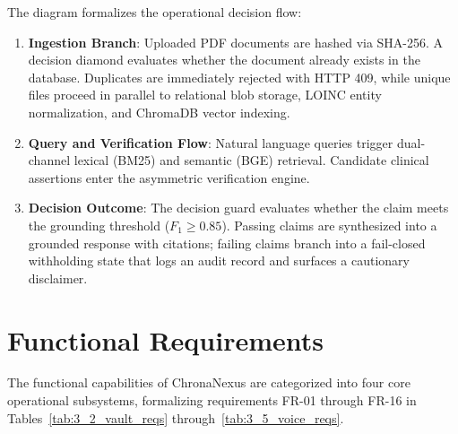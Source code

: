 The diagram formalizes the operational decision flow:
\begin{enumerate}
    \item \textbf{Ingestion Branch}: Uploaded PDF documents are hashed via SHA-256. A decision diamond evaluates whether the document already exists in the database. Duplicates are immediately rejected with HTTP 409, while unique files proceed in parallel to relational blob storage, LOINC entity normalization, and ChromaDB vector indexing.
    \item \textbf{Query and Verification Flow}: Natural language queries trigger dual-channel lexical (BM25) and semantic (BGE) retrieval. Candidate clinical assertions enter the asymmetric verification engine.
    \item \textbf{Decision Outcome}: The decision guard evaluates whether the claim meets the grounding threshold ($F_1 \ge 0.85$). Passing claims are synthesized into a grounded response with citations; failing claims branch into a fail-closed withholding state that logs an audit record and surfaces a cautionary disclaimer.
\end{enumerate}


\section{Functional Requirements}
\label{sec:sys_functional_reqs}

The functional capabilities of ChronaNexus are categorized into four core operational subsystems, formalizing requirements FR-01 through FR-16 in Tables~\ref{tab:3_2_vault_reqs} through~\ref{tab:3_5_voice_reqs}.

